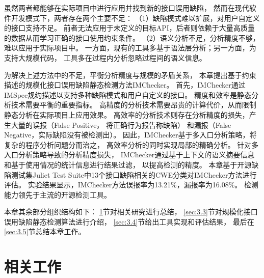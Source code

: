 虽然两者都能够在实际项目中进行应用并找到新的接口误用缺陷，
然而在现代软件开发模式下，两者存在两个主要不足：
（1）缺陷模式难以扩展，对用户自定义的接口支持不足。
前者无法应用于未定义的目标API，后者则依赖于大量高质量的数据从而学习正确的接口使用约束条件。
（2）语义分析不足，分析精度不够，难以应用于实际项目中。
一方面，现有的工具多基于语法层分析；另一方面，为支持大规模代码，
工具多在过程内分析忽略过程间的语义信息。


为解决上述方法中的不足，平衡分析精度与规模的矛盾关系，
本章提出基于约束描述的规模化接口误用缺陷静态检测方法IMChecker。
首先，IMChecker通过IMSpec规约描述以支持多种缺陷模式和用户自定义的接口。
精度和效率是静态分析技术需要平衡的重要指标。
高精度的分析技术需要昂贵的计算代价，从而限制静态分析在实际项目上应用效果。
高效率的分析技术则存在分析精度的损失，产生大量的误报（False Positive， 将正确行为报告称缺陷）
和漏报（False Negative，实际缺陷没有被检测出）。
因此，IMChecker基于多入口分析策略，将复杂的程序分析问题分而治之，
高效率分析的同时实现局部的精确分析。
针对多入口分析策略导致的分析精度损失，
IMChecker通过基于上下文的语义摘要信息和基于使用情况的统计信息进行结果过滤，
以提高检测的精度。
本章基于开源缺陷测试集Juliet Test Suite中13个接口缺陷相关的CWE分类对IMChecker方法进行评估。
实验结果显示，IMChecker方法误报率为13.21\%，漏报率为16.08\%。
检测能力领先于主流的开源检测工具。

本章其余部分组织结构如下：
\ref{sec:3.2}节对相关研究进行总结，
\ref{sec:3.3}节对规模化接口误用缺陷静态检测算法进行介绍，
\ref{sec:3.4}节给出工具实现和评估结果，
最后在\ref{sec:3.5}节总结本章工作。
\section{相关工作}
\label{sec:3.2}

